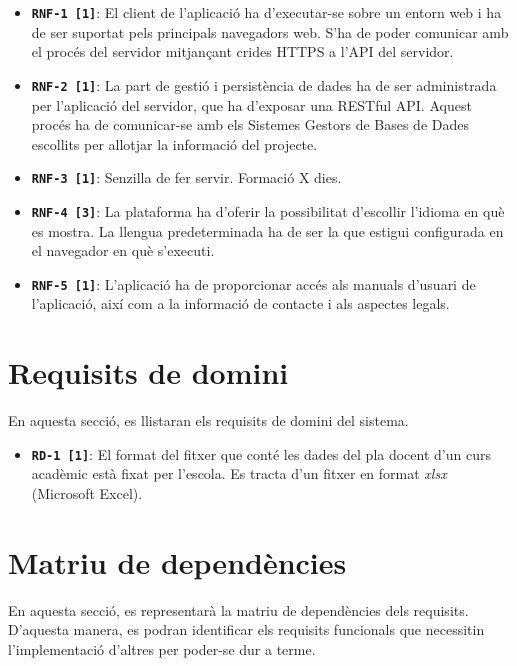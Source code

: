 \documentclass[a4paper,12pt]{ThesisStyle}
\begin{document}
\begin{itemize}
  \item \texttt{\textbf{RNF-1 [1]}}: El client de l'aplicació ha d'executar-se sobre un entorn web i ha de ser suportat pels principals navegadors web. S'ha de poder comunicar amb el procés del servidor mitjançant crides HTTPS a l'API del servidor.
  \item \texttt{\textbf{RNF-2 [1]}}: La part de gestió i persistència de dades ha de ser administrada per l'aplicació del servidor, que ha d'exposar una RESTful API. Aquest procés ha de comunicar-se amb els Sistemes Gestors de Bases de Dades escollits per allotjar la informació del projecte.

  \item \texttt{\textbf{RNF-3 [1]}}: Senzilla de fer servir. Formació X dies.
  \item \texttt{\textbf{RNF-4 [3]}}: La plataforma ha d'oferir la possibilitat d'escollir l'idioma en què es mostra. La llengua predeterminada ha de ser la que estigui configurada en el navegador en què s'executi.
  \item \texttt{\textbf{RNF-5 [1]}}: L'aplicació ha de proporcionar accés als manuals d'usuari de l'aplicació, així com a la informació de contacte i als aspectes legals.
\end{itemize}

\section{Requisits de domini}
\label{sec:requisits_domini}

En aquesta secció, es llistaran els requisits de domini del sistema.

\begin{itemize}
  \item \texttt{\textbf{RD-1 [1]}}: El format del fitxer que conté les dades del pla docent d'un curs acadèmic està fixat per l'escola. Es tracta d'un fitxer en format \emph{xlsx} (Microsoft Excel).
\end{itemize}

\section{Matriu de dependències}
\label{sec:matriu_dependencies}

En aquesta secció, es representarà la matriu de dependències dels requisits. D'aquesta manera, es podran identificar els requisits funcionals que necessitin l'implementació d'altres per poder-se dur a terme.
\end{document}
